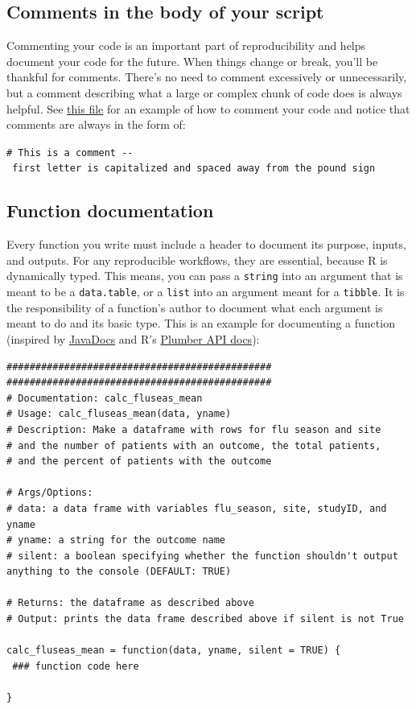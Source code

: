 \documentclass[]{book}
\begin{document}
\subsection{Comments in the body of your
script}\label{comments-in-the-body-of-your-script}

Commenting your code is an important part of reproducibility and helps
document your code for the future. When things change or break, you'll
be thankful for comments. There's no need to comment excessively or
unnecessarily, but a comment describing what a large or complex chunk of
code does is always helpful. See
\href{https://github.com/kmishra9/Flu-Absenteeism/blob/master/Master's\%20Thesis\%20-\%20Spatial\%20Epidemiology\%20of\%20Influenza/1b\%20-\%20Map-Management.R}{this
file} for an example of how to comment your code and notice that
comments are always in the form of:

\texttt{\#\ This\ is\ a\ comment\ -\/-\ first\ letter\ is\ capitalized\ and\ spaced\ away\ from\ the\ pound\ sign}

\subsection{Function documentation}\label{function-documentation}

Every function you write must include a header to document its purpose,
inputs, and outputs. For any reproducible workflows, they are essential,
because R is dynamically typed. This means, you can pass a
\texttt{string} into an argument that is meant to be a
\texttt{data.table}, or a \texttt{list} into an argument meant for a
\texttt{tibble}. It is the responsibility of a function's author to
document what each argument is meant to do and its basic type. This is
an example for documenting a function (inspired by
\href{https://www.oracle.com/technetwork/java/javase/documentation/index-137868.html\#format}{JavaDocs}
and R's
\href{https://blog.rstudio.com/2018/10/23/rstudio-1-2-preview-plumber-integration/}{Plumber
API docs}):

\begin{verbatim}
##############################################
##############################################
# Documentation: calc_fluseas_mean
# Usage: calc_fluseas_mean(data, yname)
# Description: Make a dataframe with rows for flu season and site
# and the number of patients with an outcome, the total patients,
# and the percent of patients with the outcome

# Args/Options:
# data: a data frame with variables flu_season, site, studyID, and yname
# yname: a string for the outcome name
# silent: a boolean specifying whether the function shouldn't output anything to the console (DEFAULT: TRUE)

# Returns: the dataframe as described above
# Output: prints the data frame described above if silent is not True

calc_fluseas_mean = function(data, yname, silent = TRUE) {
 ### function code here 

}
\end{verbatim}
\end{document}

